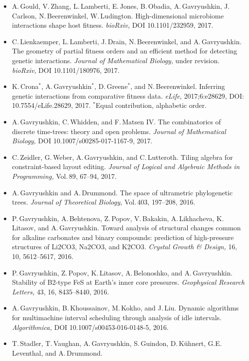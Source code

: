 \documentclass[12pt]{article}
\begin{document}
\iftoggle{full}{
\centerline{\bf Publications}
}{
\newpage
\centerline{\bf Recent publications}
}
\begin{itemize}
\item A.\,Gould, V.\,Zhang, L.\,Lamberti, E.\,Jones, B.\,Obadia, A.\,Gavryushkin, J.\,Carlson, N.\,Beerenwinkel, W.\,Ludington.
	High-dimensional microbiome interactions shape host fitness.
	{\em bioRxiv,} DOI 10.1101/232959, 2017.
\item C.\,Lienkaemper, L.\,Lamberti, J.\,Drain, N.\,Beerenwinkel, and A.\,Gavryushkin.
	The geometry of partial fitness orders and an efficient method for detecting genetic interactions.
	{\em Journal of Mathematical Biology,} under revision.
	{\em bioRxiv,} DOI 10.1101/180976, 2017.
\item K.\,Crona$^*$, A.\,Gavryushkin$^*$, D.\,Greene$^*$, and N.\,Beerenwinkel.
	Inferring genetic interactions from comparative fitness data.
	{\em eLife,} 2017;6:e28629, DOI: 10.7554/eLife.28629, 2017.
	$^*$Equal contribution, alphabetic order.
\item A.\,Gavryushkin, C.\,Whidden, and F.\,Matsen IV.
	The combinatorics of discrete time-trees: theory and open problems.
	{\em Journal of Mathematical Biology,} DOI 10.1007/s00285-017-1167-9, 2017.
\item C.\,Zeidler, G.\,Weber, A.\,Gavryushkin, and C.\,Lutteroth.
	Tiling algebra for constraint-based layout editing.
	{\em Journal of Logical and Algebraic Methods in Programming,} Vol.\,89, 67--94, 2017.
\item A.\,Gavryushkin and A.\,Drummond.
	The space of ultrametric phylogenetic trees.
	{\em Journal of Theoretical Biology,} Vol.\,403, 197--208, 2016.
\item P.\,Gavryushkin, A.\,Behtenova, Z.\,Popov, V.\,Bakakin, A.\,Likhacheva, K.\,Litasov, and A.\,Gavryushkin.
	Toward analysis of structural changes common for alkaline carbonates and binary compounds: prediction of high-pressure structures of Li2CO3, Na2CO3, and K2CO3.
	{\em Crystal Growth \& Design,} 16, 10, 5612--5617, 2016.
\item P.\,Gavryushkin, Z.\,Popov, K.\,Litasov, A.\,Belonoshko, and A.\,Gavryushkin.
	Stability of B2-type FeS at Earth's inner core pressures.
	{\em Geophysical Research Letters,} 43, 16, 8435--8440, 2016.
\item A.\,Gavryushkin, B.\,Khoussainov, M.\,Kokho, and J.\,Liu.
	Dynamic algorithms for multimachine interval scheduling through analysis of idle intervals.
	{\em Algorithmica,} DOI 10.1007/s00453-016-0148-5, 2016.
\item T.\,Stadler, T.\,Vaughan, A.\,Gavryushkin, S.\,Guindon, D.\,K\"uhnert, G.E.\,Leventhal, and A.\,Drummond.

\end{itemize}
\end{document}
